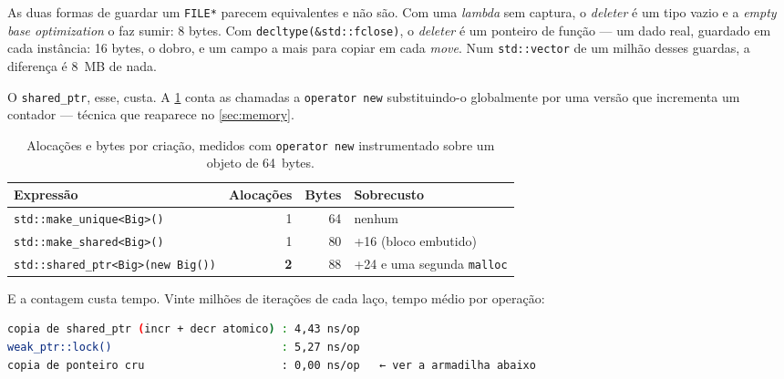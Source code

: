 \begin{armadilha}
As duas formas de guardar um \texttt{FILE*} parecem equivalentes e não são.
Com uma \emph{lambda} sem captura, o \emph{deleter} é um tipo vazio e a
\emph{empty base optimization} o faz sumir: 8 bytes. Com
\texttt{decltype(\&std::fclose)}, o \emph{deleter} é um ponteiro de função ---
um dado real, guardado em cada instância: 16 bytes, o dobro, e um campo a mais
para copiar em cada \emph{move}. Num \texttt{std::vector} de um milhão desses
guardas, a diferença é 8~MB de nada.
\end{armadilha}

O \texttt{shared\_ptr}, esse, custa. A \cref{tab:sp-aloc} conta as chamadas a
\texttt{operator new} substituindo-o globalmente por uma versão que incrementa
um contador --- técnica que reaparece no \cref{sec:memory}.

\begin{table}[htbp]
\centering
\caption{Alocações e bytes por criação, medidos com \texttt{operator new}
         instrumentado sobre um objeto de 64~bytes.}
\label{tab:sp-aloc}
\footnotesize
\begin{tabular}{@{}lrrl@{}}
\toprule
\textbf{Expressão} & \textbf{Alocações} & \textbf{Bytes} & \textbf{Sobrecusto} \\
\midrule
\texttt{std::make\_unique<Big>()}          & 1 & 64 & nenhum \\
\texttt{std::make\_shared<Big>()}          & 1 & 80 & +16 (bloco embutido) \\
\texttt{std::shared\_ptr<Big>(new Big())}  & \textbf{2} & 88 & +24 e uma segunda \texttt{malloc} \\
\bottomrule
\end{tabular}
\end{table}

E a contagem custa tempo. Vinte milhões de iterações de cada laço, tempo médio
por operação:

\begin{lstlisting}[style=bt, language=bash,
    caption={Custo por operação, 20 milhões de iterações, \texttt{-O2}.}]
copia de shared_ptr (incr + decr atomico) : 4,43 ns/op
weak_ptr::lock()                          : 5,27 ns/op
copia de ponteiro cru                     : 0,00 ns/op   ← ver a armadilha abaixo
\end{lstlisting}

